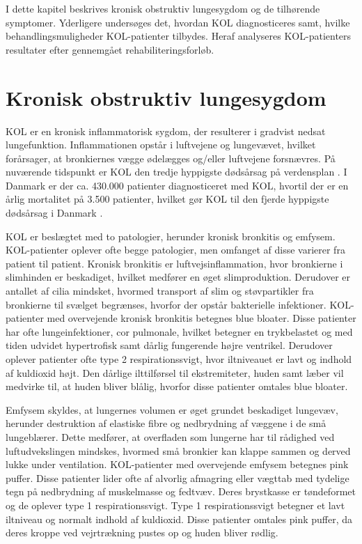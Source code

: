 I dette kapitel beskrives kronisk obstruktiv lungesygdom og de tilhørende symptomer. Yderligere undersøges det, hvordan KOL diagnosticeres samt, hvilke behandlingsmuligheder KOL-patienter tilbydes. Heraf analyseres KOL-patienters resultater efter gennemgået rehabiliteringsforløb.

\section{Kronisk obstruktiv lungesygdom}
KOL er en kronisk inflammatorisk sygdom, der resulterer i gradvist nedsat lungefunktion. Inflammationen opstår i luftvejene og lungevævet, hvilket forårsager, at bronkiernes vægge ødelægges og/eller luftvejene forsnævres. På nuværende tidspunkt er KOL den tredje hyppigste dødsårsag på verdensplan \cite{WHO2017}. I Danmark er der ca. 430.000 patienter diagnosticeret med KOL, hvortil der er en årlig mortalitet på 3.500 patienter, hvilket gør KOL til den fjerde hyppigste dødsårsag i Danmark \cite{Basisbogen2016}.


KOL er beslægtet med to patologier, herunder kronisk bronkitis og emfysem. KOL-patienter oplever ofte begge patologier, men omfanget af disse varierer fra patient til patient.\cite{Basisbogen2016}
Kronisk bronkitis er luftvejsinflammation, hvor bronkierne i slimhinden er beskadiget, hvilket medfører en øget slimproduktion. Derudover er antallet af cilia mindsket, hvormed transport af slim og støvpartikler fra bronkierne til svælget begrænses, hvorfor der opstår bakterielle infektioner.\cite{Frausing2011,Britannica2016} KOL-patienter med overvejende kronisk bronkitis betegnes blue bloater. Disse patienter har ofte lungeinfektioner, cor pulmonale, hvilket betegner en trykbelastet og med tiden udvidet hypertrofisk samt dårlig fungerende højre ventrikel. Derudover oplever patienter ofte  type 2 respirationssvigt, hvor iltniveauet er lavt og indhold af kuldioxid højt. Den dårlige ilttilførsel til ekstremiteter, huden samt læber vil medvirke til, at huden bliver blålig, hvorfor disse patienter omtales blue bloater.\cite{Healthguidances2016}

Emfysem skyldes, at lungernes volumen er øget grundet beskadiget lungevæv, herunder destruktion af elastiske fibre og nedbrydning af væggene i de små lungeblærer. Dette medfører, at overfladen som lungerne har til rådighed ved luftudvekslingen mindskes, hvormed små bronkier kan klappe sammen og derved lukke under ventilation.\cite{Frausing2011a,Flaschen-Hansen2008} KOL-patienter med overvejende emfysem betegnes pink puffer. Disse patienter lider ofte af alvorlig afmagring eller vægttab med tydelige tegn på nedbrydning af muskelmasse og fedtvæv. Deres brystkasse er tøndeformet og de oplever type 1 respirationssvigt. Type 1 respirationssvigt betegner et lavt iltniveau og normalt indhold af kuldioxid. Disse patienter omtales pink puffer, da deres kroppe ved vejrtrækning pustes op og huden bliver rødlig.\cite{Healthguidances2016}

